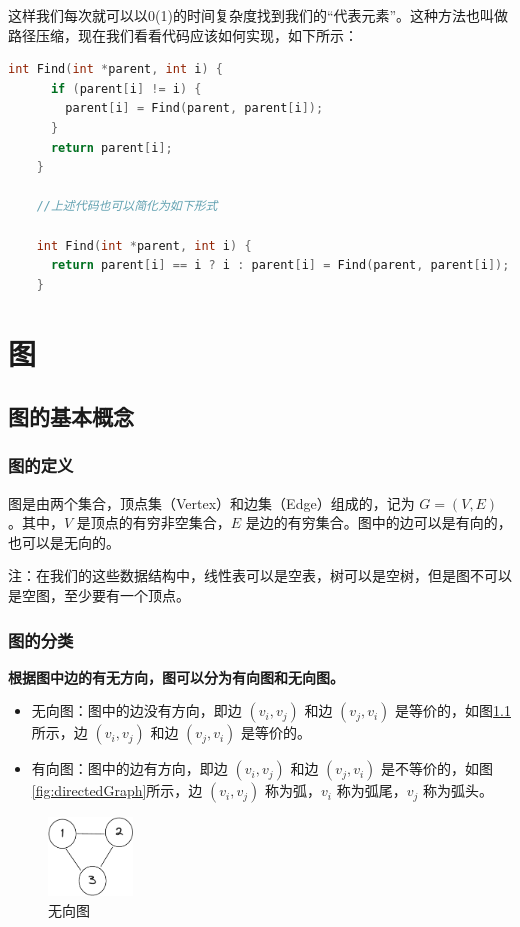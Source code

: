 \documentclass[lang=cn,newtx,10pt,scheme=chinese]{elegantbook}
\begin{document}
  这样我们每次就可以以0(1)的时间复杂度找到我们的“代表元素”。这种方法也叫做路径压缩，现在我们看看代码应该如何实现，如下所示：

  \begin{lstlisting}[language=C++, caption={路径压缩}]
    int Find(int *parent, int i) {
      if (parent[i] != i) {
        parent[i] = Find(parent, parent[i]);
      }
      return parent[i];
    }

    //上述代码也可以简化为如下形式

    int Find(int *parent, int i) {
      return parent[i] == i ? i : parent[i] = Find(parent, parent[i]);
    }
  \end{lstlisting}
\chapter{图}

\section{图的基本概念}



\subsection{图的定义}
图是由两个集合，顶点集（Vertex）和边集（Edge）组成的，记为 $G = (V, E)$。其中，$V$ 是顶点的有穷非空集合，$E$ 是边的有穷集合。图中的边可以是有向的，也可以是无向的。

注：在我们的这些数据结构中，线性表可以是空表，树可以是空树，但是图不可以是空图，至少要有一个顶点。

\subsection{图的分类}

\textbf{根据图中边的有无方向，图可以分为有向图和无向图。}

\begin{itemize}
  \item 无向图：图中的边没有方向，即边 $(v_i, v_j)$ 和边 $(v_j, v_i)$ 是等价的，如图\ref{fig:undirectedGraph}所示，边 $(v_i, v_j)$ 和边 $(v_j, v_i)$ 是等价的。
  \item 有向图：图中的边有方向，即边 $(v_i, v_j)$ 和边 $(v_j, v_i)$ 是不等价的，如图\ref{fig:directedGraph}所示，边 $(v_i, v_j)$ 称为弧，$v_i$ 称为弧尾，$v_j$ 称为弧头。
  \end{itemize}

  \begin{figure}[h!]
    \centering
    \includegraphics[width=0.2\textwidth]{./figure/pdf/cropped/undirection.pdf}
    \caption{无向图}
    \label{fig:undirectedGraph}
  \end{figure}
\end{document}
